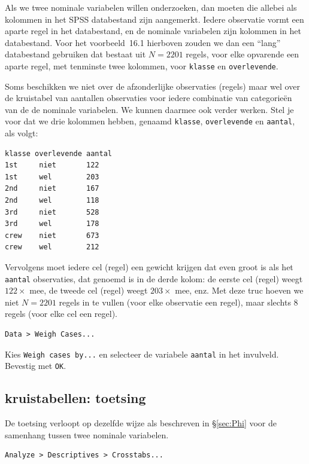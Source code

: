 \documentclass[
]{book}
\begin{document}
Als we twee nominale variabelen willen onderzoeken, dan moeten die
allebei als kolommen in het SPSS databestand zijn aangemerkt. Iedere
observatie vormt een aparte regel in het databestand, en de nominale
variabelen zijn kolommen in het databestand. Voor het
voorbeeld~16.1 hierboven zouden we dan een ``lang'' databestand
gebruiken dat bestaat uit \(N=2201\) regels, voor elke opvarende een
aparte regel, met tenminste twee kolommen, voor \texttt{klasse} en
\texttt{overlevende}.

Soms beschikken we niet over de afzonderlijke observaties (regels) maar
wel over de kruistabel van aantallen observaties voor iedere combinatie
van categorieën van de de nominale variabelen. We kunnen daarmee ook
verder werken. Stel je voor dat we drie kolommen hebben, genaamd
\texttt{klasse}, \texttt{overlevende} en \texttt{aantal}, als volgt:

\begin{verbatim}
klasse overlevende aantal
1st     niet       122
1st     wel        203
2nd     niet       167
2nd     wel        118
3rd     niet       528
3rd     wel        178
crew    niet       673
crew    wel        212
\end{verbatim}

Vervolgens moet iedere cel (regel) een gewicht krijgen dat even groot is
als het \texttt{aantal} observaties, dat genoemd is in de derde kolom: de
eerste cel (regel) weegt \(122\times\) mee, de tweede cel (regel) weegt
\(203\times\) mee, enz. Met deze truc hoeven we niet \(N=2201\) regels in te
vullen (voor elke observatie een regel), maar slechts 8 regels (voor
elke cel een regel).

\begin{verbatim}
Data > Weigh Cases... 
\end{verbatim}

Kies \texttt{Weigh\ cases\ by...} en selecteer de variabele \texttt{aantal} in
het invulveld. Bevestig met \texttt{OK}.

\subsection{kruistabellen: toetsing}\label{kruistabellen-toetsing}

De toetsing verloopt op dezelfde wijze als beschreven in
§\ref{sec:Phi} voor
de samenhang tussen twee nominale variabelen.

\begin{verbatim}
Analyze > Descriptives > Crosstabs...
\end{verbatim}
\end{document}
